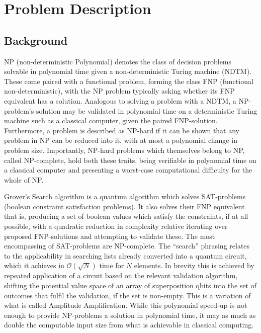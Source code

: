 \documentclass[msc,lith,english]{liuthesis}
\author{\parbox{\textwidth}{Emil Segerbäck\\ Olav Övrebö}}
\begin{document}
\chapter{Problem Description}
\section{Background}
NP (non-deterministic Polynomial) denotes the class of decision problems solvable in polynomial time given a non-deterministic Turing machine (NDTM). These come paired with a functional problem, forming the class FNP (functional non-deterministic), with the NP problem typically asking whether its FNP equivalent has a solution. Analogous to solving a problem with a NDTM, a NP-problem's solution may be validated in polynomial time on a deterministic Turing machine such as a classical computer, given the paired FNP-solution. Furthermore, a problem is described as NP-hard if it can be shown that any problem in NP can be reduced into it, with at most a polynomial change in problem size. Importantly, NP-hard problems which themselves belong to NP, called NP-complete, hold both these traits, being verifiable in polynomial time on a classical computer and presenting a worst-case computational difficulty for the whole of NP. \cite{CCAMA}

Grover’s Search algorithm is a quantum algorithm which solves SAT-problems (boolean constraint satisfaction problems). It also solves their FNP equivalent that is, producing a set of boolean values which satisfy the constraints, if at all possible, with a quadratic reduction in complexity relative iterating over proposed FNP-solutions and attempting to validate these.\cite{QCQI}\cite{CCAMA} The most encompassing of SAT-problems are NP-complete. The “search” phrasing relates to the applicability in searching lists already converted into a quantum circuit, which it achieves in $\mathcal{O}(\sqrt{N})$ time for $N$ elements. In brevity this is achieved by repeated application of a circuit based on the relevant validation algorithm, shifting the potential value space of an array of superposition qbits into the set of outcomes that fulfil the validation, if the set is non-empty. This is a variation of what is called Amplitude Amplification. While this polynomial speed-up is not enough to provide NP-problems a solution in polynomial time, it may as much as double the computable input size from what is achievable in classical computing.\cite{EIQC}
\end{document}
